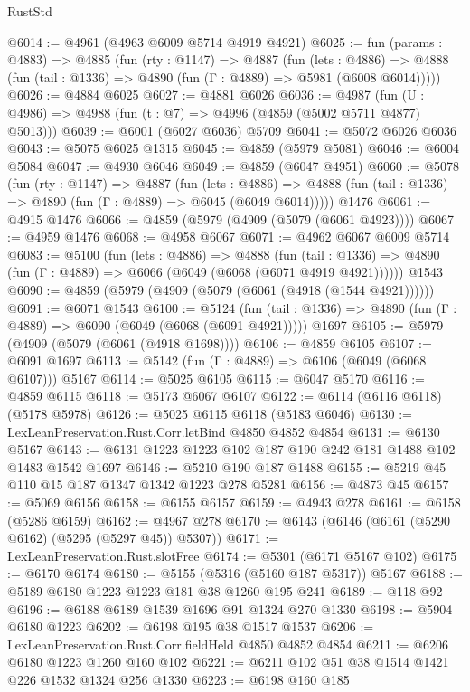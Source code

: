 \begin{lexlean}{RustStd}
\begin{coremodule}
@6014 := @4961 (@4963 @6009 @5714 @4919 @4921)
@6025 := fun (params : @4883) =>
  @4885
    (fun (rty : @1147) =>
    @4887
      (fun (lets : @4886) =>
      @4888 (fun (tail : @1336) => @4890 (fun (Γ : @4889) => @5981 (@6008 @6014)))))
@6026 := @4884 @6025
@6027 := @4881 @6026
@6036 := @4987 (fun (U : @4986) => @4988 (fun (t : @7) => @4996 (@4859 (@5002 @5711 @4877) @5013)))
@6039 := @6001 (@6027 @6036) @5709
@6041 := @5072 @6026 @6036
@6043 := @5075 @6025 @1315
@6045 := @4859 (@5979 @5081)
@6046 := @6004 @5084
@6047 := @4930 @6046
@6049 := @4859 (@6047 @4951)
@6060 := @5078
    (fun (rty : @1147) =>
    @4887
      (fun (lets : @4886) =>
      @4888 (fun (tail : @1336) => @4890 (fun (Γ : @4889) => @6045 (@6049 @6014)))))
    @1476
@6061 := @4915 @1476
@6066 := @4859 (@5979 (@4909 (@5079 (@6061 @4923))))
@6067 := @4959 @1476
@6068 := @4958 @6067
@6071 := @4962 @6067 @6009 @5714
@6083 := @5100
    (fun (lets : @4886) =>
    @4888
      (fun (tail : @1336) => @4890 (fun (Γ : @4889) => @6066 (@6049 (@6068 (@6071 @4919 @4921))))))
    @1543
@6090 := @4859 (@5979 (@4909 (@5079 (@6061 (@4918 (@1544 @4921))))))
@6091 := @6071 @1543
@6100 := @5124
    (fun (tail : @1336) => @4890 (fun (Γ : @4889) => @6090 (@6049 (@6068 (@6091 @4921)))))
    @1697
@6105 := @5979 (@4909 (@5079 (@6061 (@4918 @1698))))
@6106 := @4859 @6105
@6107 := @6091 @1697
@6113 := @5142 (fun (Γ : @4889) => @6106 (@6049 (@6068 @6107))) @5167
@6114 := @5025 @6105
@6115 := @6047 @5170
@6116 := @4859 @6115
@6118 := @5173 @6067 @6107
@6122 := @6114 (@6116 @6118) (@5178 @5978)
@6126 := @5025 @6115 @6118 (@5183 @6046)
@6130 := LexLeanPreservation.Rust.Corr.letBind @4850 @4852 @4854
@6131 := @6130 @5167
@6143 := @6131 @1223 @1223 @102 @187 @190 @242 @181 @1488 @102 @1483 @1542 @1697
@6146 := @5210 @190 @187 @1488
@6155 := @5219 @45 @110 @15 @187 @1347 @1342 @1223 @278 @5281
@6156 := @4873 @45
@6157 := @5069 @6156
@6158 := @6155 @6157
@6159 := @4943 @278
@6161 := @6158 (@5286 @6159)
@6162 := @4967 @278
@6170 := @6143 (@6146 (@6161 (@5290 @6162) (@5295 (@5297 @45)) @5307))
@6171 := LexLeanPreservation.Rust.slotFree
@6174 := @5301 (@6171 @5167 @102)
@6175 := @6170 @6174
@6180 := @5155 (@5316 (@5160 @187 @5317)) @5167
@6188 := @5189 @6180 @1223 @1223 @181 @38 @1260 @195 @241
@6189 := @118 @92
@6196 := @6188 @6189 @1539 @1696 @91 @1324 @270 @1330
@6198 := @5904 @6180 @1223
@6202 := @6198 @195 @38 @1517 @1537
@6206 := LexLeanPreservation.Rust.Corr.fieldHeld @4850 @4852 @4854
@6211 := @6206 @6180 @1223 @1260 @160 @102
@6221 := @6211 @102 @51 @38 @1514 @1421 @226 @1532 @1324 @256 @1330
@6223 := @6198 @160 @185

\end{coremodule}
\end{lexlean}
